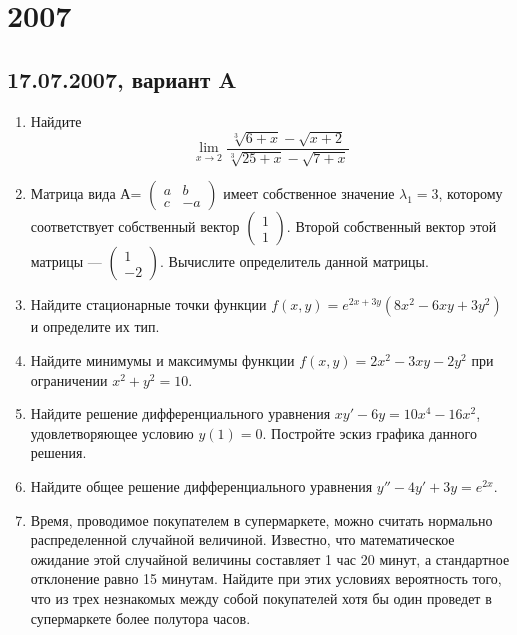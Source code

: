 \documentclass[pdftex,12pt,a4paper]{article}
\begin{document}
\section{2007}

\subsection{17.07.2007, вариант A}
\begin{enumerate}
\item Найдите 
\begin{equation}
\lim_{x \to 2}\frac{\sqrt[3]{6+x}-\sqrt{x+2}}{\sqrt[3]{25+x}-\sqrt{7+x}}
\end{equation}
\item Матрица вида А=
$\left( \begin{array}{cc}
a & b\\
c & -a
\end{array} \right)$ 
имеет собственное значение $\lambda_1=3$, которому соответствует собственный вектор 
$\left( \begin{array}{c}
1\\
1
\end{array} \right).$ Второй собственный вектор этой матрицы --- 
$\left( \begin{array}{c}
1\\
-2
\end{array} \right).$ 
Вычислите определитель данной матрицы.\\
\item Найдите стационарные точки функции $f(x,y)=e^{2x+3y}(8x^2-6xy+3y^2)$ и определите их тип.\\
\item Найдите минимумы и максимумы функции $f(x,y)=2x^2-3xy-2y^2$ при ограничении $x^2+y^2=10$.\\
\item Найдите решение дифференциального уравнения $xy'-6y=10x^4-16x^2$, удовлетворяющее условию $y(1)=0$. Постройте эскиз графика данного решения. \\
\item Найдите общее решение дифференциального уравнения $y''-4y'+3y=e^{2x}$.\\
\item Время, проводимое покупателем в супермаркете, можно считать нормально распределенной случайной величиной. Известно, что математическое ожидание этой случайной величины составляет 1 час 20 минут, а стандартное отклонение равно 15 минутам. Найдите при этих условиях вероятность того, что из трех незнакомых между собой покупателей хотя бы один проведет в супермаркете более полутора часов.\\

\end{enumerate}
\end{document}
